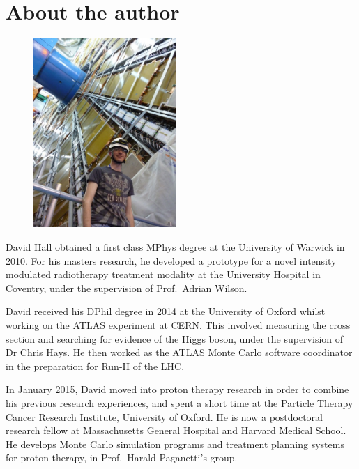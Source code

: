 
\chapter*{About the author}

\begin{figure}
	\vspace{-20pt}
	\centering
	\includegraphics[width=0.48\textwidth]{tex/david_photo}
	\vspace{-20pt}
\end{figure}

David Hall obtained a first class MPhys degree at the University of Warwick in 2010. For his 
masters research, he developed a prototype for a novel intensity modulated radiotherapy 
treatment modality at the University Hospital in Coventry, under the supervision of Prof.\ 
Adrian Wilson.

David received his DPhil degree in 2014 at the University of Oxford whilst working on the 
ATLAS experiment at CERN. This involved measuring the \WW cross section and searching for 
evidence of the Higgs boson, under the supervision of Dr Chris Hays. He then worked as the 
ATLAS Monte Carlo software coordinator in the preparation for Run-II of the LHC.

In January 2015, David moved into proton therapy research in order to combine his previous 
research experiences, and spent a short time at the Particle Therapy Cancer Research 
Institute, University of Oxford. He is now a postdoctoral research fellow at Massachusetts 
General Hospital and Harvard Medical School. He develops Monte Carlo simulation programs and 
treatment planning systems for proton therapy, in Prof.\ Harald Paganetti's group.

\nocite{HWW-RunI-submit,ATLAS:combination:2013,YR3,ATLAS-discovery2,ATLAS-discovery,WW-7TeV,WW-1ifb,VersatileLinkConnectors,VersatileLinkFibres,VersatileLink}

\let\oldbibname\bibname
\renewcommand{\bibname}{Selected publications}


\let\bibname\oldbibname
